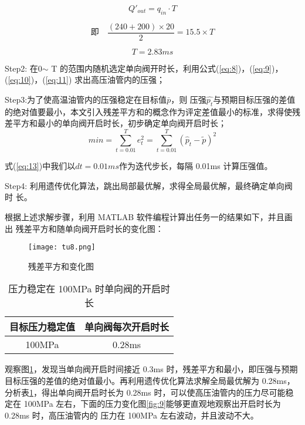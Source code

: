 \documentclass{cumcmthesis}
\begin{document}
\begin{equation}
Q'_{out}=q_{in}\cdot T\label{eq:12}
\end{equation}

\begin{equation*}
  \text{即}\quad\frac{\left(240+200\right)\times 20}{2}=15.5\times T
\end{equation*}

\begin{equation*}
T=2.83ms
\end{equation*}

Step2: 在0$\sim$ T 的范围内随机选定单向阀开时长，利用公式(\ref{eq:8})，(\ref{eq:9})，(\ref{eq:10})，(\ref{eq:11}) 求出高压油管内的压强；

Step3:为了使高温油管内的压强稳定在目标值$\bar{p}$，则 压强$\hat{p_{t}}$与预期目标压强的差值 的绝对值要最小，本文引入残差平方和的概念作为评定差值最小的标准，求得使残差平方和最小的单向阀开启时长，初步确定单向阀开启时长； 
\begin{equation}
min=\sum_{t=0.01}^{T}e_{t}^{2}=\sum_{t=0.01}^{T}\left(\hat{p}_{t}-\tilde{p}\right)^{2}\label{eq:13}
\end{equation}

式(\ref{eq:13})中我们以$dt=0.01ms$作为迭代步长，每隔 0.01ms 计算压强值。 

Step4: 利用遗传优化算法，跳出局部最优解，求得全局最优解，最终确定单向阀时 长。 

根据上述求解步骤，利用 MATLAB 软件编程计算出任务一的结果如下，并且画出 残差平方和随单向阀开启时长的变化图：

 \begin{figure}[htb] \centering 
	
	\texttt{[image: tu8.png]} 
	
	\caption{残差平方和变化图} \label{fig:8} \end{figure}  

\begin{table}[!htbp]
	\caption{压力稳定在 100MPa 时单向阀的开启时长}\label{tab001} \centering
	\begin{tabular}{cc}
		\toprule[1.7pt]
		目标压力稳定值 & 单向阀每次开启时长 \\
		\midrule[1pt]
		100MPa& 0.28ms \\
	
		\bottomrule[1.7pt]
	\end{tabular}\label{tab:1}
\end{table}

观察图\ref{fig:8}，发现当单向阀开启时间接近 0.3ms 时，残差平方和最小，即压强与预期 目标压强的差值的绝对值最小。再利用遗传优化算法求解全局最优解为 0.28ms，分析表\ref{tab:1}，得出单向阀开启时长为 0.28ms 时，可以使高压油管内的压力尽可能稳定在 100MPa 左右，下面的压力变化图\ref{fig:9}能够更直观地观察出开启时长为 0.28ms 时，高压油管内的 压力在 100MPa 左右波动，并且波动不大。 
\end{document}
